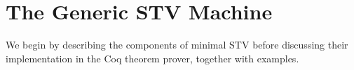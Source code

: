 \documentclass{llncs}
\begin{document}




\section{The Generic STV Machine}       
%

We begin by describing the components of minimal STV before
discussing their implementation in the Coq theorem prover, together
with examples. 

\end{document}
